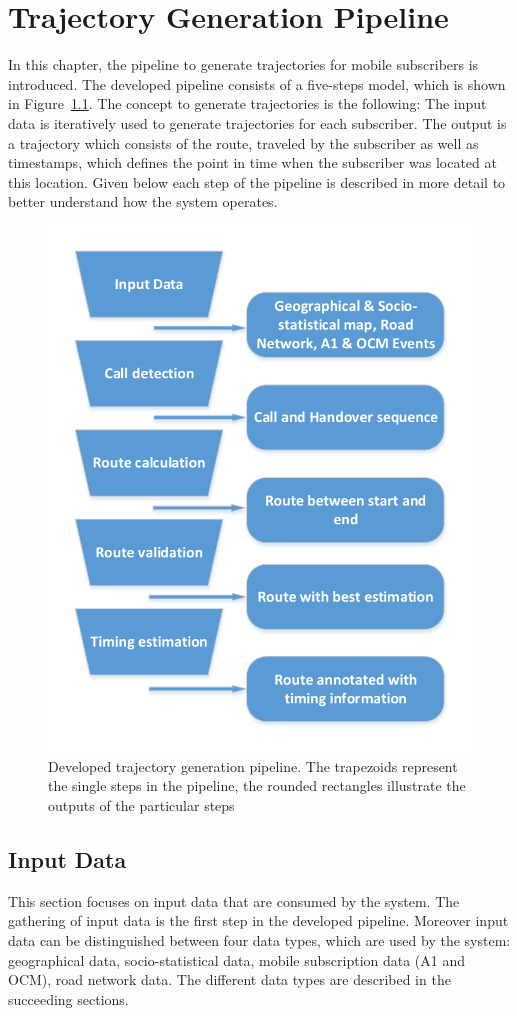 \chapter{Trajectory Generation Pipeline}
\label{cha:concepts}
In this chapter, the pipeline to generate trajectories for mobile subscribers is introduced. The developed pipeline consists of a five-steps model, which is shown in Figure~\ref{fig:pipeline}. The concept to generate trajectories is the following: The input data is iteratively used to generate trajectories for each subscriber. The output is a trajectory which consists of the route, traveled by the subscriber as well as timestamps, which defines the point in time when the subscriber was located at this location. Given below each step of the pipeline is described in more detail to better understand how the system operates.
\begin{figure}
	\centering
	\includegraphics[width=0.7\linewidth]{./images/pipeline}
	\caption{Developed trajectory generation pipeline. The trapezoids represent the single steps in the pipeline, the rounded rectangles illustrate the
	outputs of the particular steps}
	\label{fig:pipeline}
\end{figure}
\section{Input Data}
This section focuses on input data that are consumed by the system. The gathering of input data is the first step in the developed pipeline. Moreover input data can be distinguished between four data types, which are used by the system: geographical data, socio-statistical data, mobile subscription data (A1 and OCM), road network data. The different data types are described in the succeeding sections.
